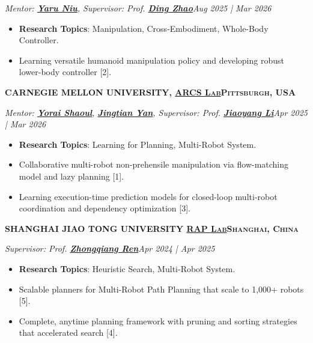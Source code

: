 \documentclass[a4paper,9pt]{extarticle}
\begin{document}
\par\textit{Mentor: {\href{https://yaruniu.com/}{\textbf{Yaru Niu}}}, Supervisor: Prof. {\href{https://www.meche.engineering.cmu.edu/directory/bios/zhao-ding.html}{\textbf{Ding Zhao}}}\hfill Aug 2025 | Mar 2026}  %
\begin{itemize}
    \item \textbf{Research Topics}: Manipulation, Cross-Embodiment, Whole-Body Controller.
    \item Learning versatile humanoid manipulation policy and developing robust lower-body controller [2].
\end{itemize}
{\textbf{\fontsize{12pt}{4pt}\selectfont C}\textbf{\scshape ARNEGIE MELLON UNIVERSITY, {\href{https://www.ri.cmu.edu/robotics-groups/arcs-lab/}{ARCS Lab}}\hfill Pittsburgh, USA}}
\par\textit{Mentor: {\href{https://yoraish.com/}{\textbf{Yorai Shaoul}}}, {\href{https://jingtianyan.github.io/}{\textbf{Jingtian Yan}}}, Supervisor: Prof. {\href{https://jiaoyangli.me/}{\textbf{Jiaoyang Li}}}\hfill Apr 2025 | Mar 2026}  %
\begin{itemize}
    \item \textbf{Research Topics}: Learning for Planning, Multi-Robot System.
     \item Collaborative multi-robot non-prehensile manipulation via flow-matching model and lazy planning [1].
    \item Learning execution-time prediction models for closed-loop multi-robot coordination and dependency optimization [3].
\end{itemize}
{\textbf{\fontsize{12pt}{4pt}\selectfont S}\textbf{\scshape HANGHAI JIAO TONG UNIVERSITY {\href{https://rap-lab.github.io/}{RAP Lab}}\hfill Shanghai, China}}
\par\textit{Supervisor: Prof. {\href{https://rap-lab.github.io/team/zren/}{\textbf{Zhongqiang Ren}}}\hfill Apr 2024 | Apr 2025} %
\begin{itemize}
    \item \textbf{Research Topics}: Heuristic Search, Multi-Robot System.
    \item Scalable planners for Multi-Robot Path Planning that scale to 1,000+ robots [5].
    \item Complete, anytime planning framework with pruning and sorting strategies that accelerated search [4].
\end{itemize}
\end{document}
